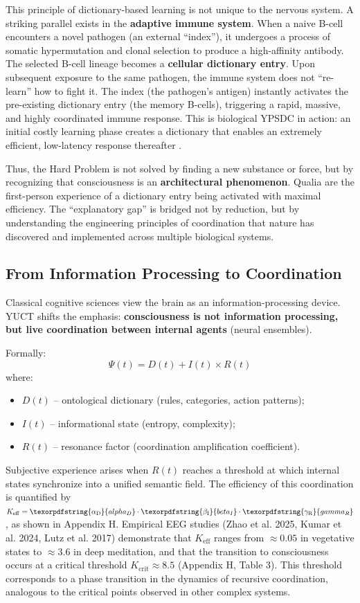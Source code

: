 \documentclass[12pt,a4paper]{article}
\DeclareRobustCommand{\alD}{\texorpdfstring{\ensuremath{\alpha_{\mathrm{D}}}}{alpha_D}}
\DeclareRobustCommand{\beI}{\texorpdfstring{\ensuremath{\beta_{\mathrm{I}}}}{beta_I}}
\DeclareRobustCommand{\gaR}{\texorpdfstring{\ensuremath{\gamma_{\mathrm{R}}}}{gamma_R}}
\newcommand{\eff}{\mathrm{eff}}
\newcommand{\Ke}{K_{\eff}}
\newcommand{\Kcrit}{K_{\mathrm{crit}}}
\begin{document}
	This principle of dictionary-based learning is not unique to the nervous system. A striking parallel exists in the \textbf{adaptive immune system}. When a naive B-cell encounters a novel pathogen (an external ``index''), it undergoes a process of somatic hypermutation and clonal selection to produce a high-affinity antibody. The selected B-cell lineage becomes a \textbf{cellular dictionary entry}. Upon subsequent exposure to the same pathogen, the immune system does not ``re-learn'' how to fight it. The index (the pathogen's antigen) instantly activates the pre-existing dictionary entry (the memory B-cells), triggering a rapid, massive, and highly coordinated immune response. This is biological YPSDC in action: an initial costly learning phase creates a dictionary that enables an extremely efficient, low-latency response thereafter \cite{Alberts2014}.
	
	Thus, the Hard Problem is not solved by finding a new substance or force, but by recognizing that consciousness is an \textbf{architectural phenomenon}. Qualia are the first-person experience of a dictionary entry being activated with maximal efficiency. The ``explanatory gap'' is bridged not by reduction, but by understanding the engineering principles of coordination that nature has discovered and implemented across multiple biological systems.
	
	\subsection{From Information Processing to Coordination}
	
	Classical cognitive sciences view the brain as an information-processing device. YUCT shifts the emphasis: \textbf{consciousness is not information processing, but live coordination between internal agents} (neural ensembles).
	
	Formally:
	\[
	\Psi(t) = D(t) + I(t) \times R(t)
	\]
	where:
	\begin{itemize}
		\item $D(t)$ – ontological dictionary (rules, categories, action patterns);
		\item $I(t)$ – informational state (entropy, complexity);
		\item $R(t)$ – resonance factor (coordination amplification coefficient).
	\end{itemize}
	
	Subjective experience arises when $R(t)$ reaches a threshold at which internal states synchronize into a unified semantic field. The efficiency of this coordination is quantified by $\Ke = \alD \cdot \beI \cdot \gaR$, as shown in Appendix H. Empirical EEG studies (Zhao et al. 2025, Kumar et al. 2024, Lutz et al. 2017) demonstrate that $\Ke$ ranges from $\approx 0.05$ in vegetative states to $\approx 3.6$ in deep meditation, and that the transition to consciousness occurs at a critical threshold $\Kcrit \approx 8.5$ (Appendix H, Table 3). This threshold corresponds to a phase transition in the dynamics of recursive coordination, analogous to the critical points observed in other complex systems.
	
\end{document}
